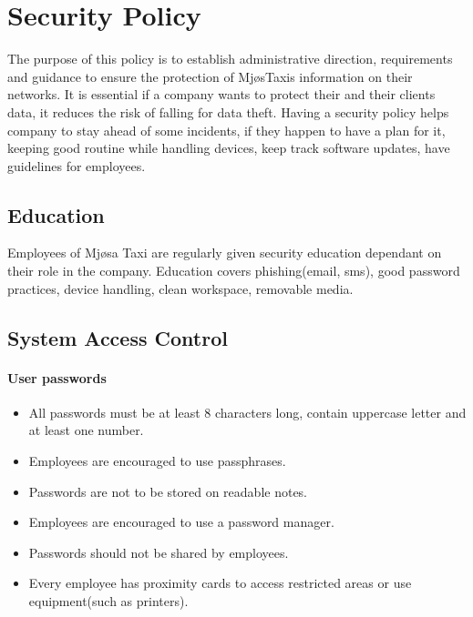 \chapter{Security Policy}
\label{chap:securityPolicy}


The purpose of this policy is to establish administrative direction, requirements and guidance to ensure the protection of MjøsTaxis information on their networks.
It is essential if a company wants to protect their and their clients data, it reduces the risk of falling for data theft.
Having a security policy helps company to stay ahead of some incidents, if they happen to have a plan for it, keeping good routine while handling devices, keep track software updates, have guidelines for employees.

\section{Education}
Employees of Mjøsa Taxi are regularly given security education dependant on their role in the company.
Education covers phishing(email, sms), good password practices, device handling, clean workspace, removable media.

\section{System Access Control}
\subsubsection*{User passwords} 
    \begin{itemize}[noitemsep]  %
        \item All passwords must be at least 8 characters long, contain uppercase letter and at least one number.
        \item Employees are encouraged to use passphrases.
        \item Passwords are not to be stored on readable notes.
        \item Employees are encouraged to use a password manager.
        \item Passwords should not be shared by employees.
        \item Every employee has proximity cards to access restricted areas or use equipment(such as printers).
    \end{itemize}{} 

